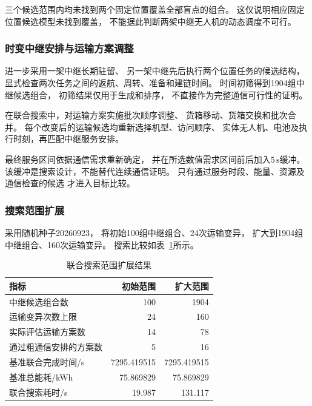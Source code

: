 \documentclass[bwprint]{gmcmthesis}
\begin{document}
三个候选范围内均未找到两个固定位置覆盖全部盲点的组合。
这仅说明相应固定位置候选模型未找到覆盖，
不能据此判断两架中继无人机的动态调度不可行。

\subsubsection{时变中继安排与运输方案调整}

进一步采用一架中继长期驻留、
另一架中继先后执行两个位置任务的候选结构，
显式检查两次任务之间的返航、周转、准备和建链时间。
时间初筛得到1904组中继候选组合，
初筛结果仅用于生成和排序，
不直接作为完整通信可行性的证明。

在联合搜索中，对运输方案实施批次顺序调整、
货箱移动、货箱交换和批次合并。
每个改变后的运输候选均重新选择机型、访问顺序、
实体无人机、电池及执行时刻，再匹配中继服务安排。

最终服务区间依据通信需求重新确定，
并在所选数值需求区间前后加入$5\,\mathrm{s}$缓冲。
该缓冲是搜索设计，不能替代连续通信证明。
只有通过服务时段、能量、资源及通信检查的候选
才进入目标比较。

\subsubsection{搜索范围扩展}

采用随机种子20260923，
将初始100组中继组合、24次运输变异，
扩大到1904组中继组合、160次运输变异。
搜索比较如表~\ref{tab:q3_search}所示。

\begin{table}[htbp]
    \centering
    \caption{联合搜索范围扩展结果}
    \label{tab:q3_search}
    \begin{tabular}{lrr}
        \toprule
        指标 & 初始范围 & 扩大范围 \\
        \midrule
        中继候选组合数 & 100 & 1904 \\
        运输变异次数上限 & 24 & 160 \\
        实际评估运输方案数 & 14 & 78 \\
        通过粗通信安排的方案数 & 5 & 16 \\
        基准联合完成时间/s & 7295.419515 & 7295.419515 \\
        基准总能耗/kWh & 75.869829 & 75.869829 \\
        联合搜索耗时/s & 19.987 & 131.117 \\
        \bottomrule
    \end{tabular}
\end{table}
\end{document}
